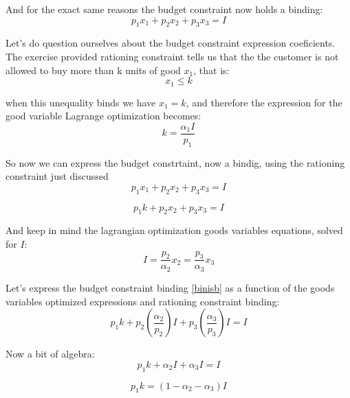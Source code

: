 \documentclass{article}
\begin{document}
\medskip

And for the exact same reasons the budget constraint now holds a binding:
\begin{equation}\label{bin}
   p_1x_1 + p_2x_2 + p_3x_3 = I
\end{equation}

Let's do question ourselves about the budget constraint expression coeficients. The exercise provided rationing constraint tells us that the the customer is not allowed to buy more than k units of good $x_1$, that is:
\begin{equation}
  x_1 \leq k
\end{equation}

when this unequality binds we have $x_1 = k$, and therefore the expression for the good variable Lagrange optimization becomes:
\begin{equation}
  k = \frac{\alpha_1 I}{p_1}
\end{equation}

So now we can express the budget constrtaint, now a bindig, using the rationing constraint just discussed
\begin{equation}\label{binis}
   p_1x_1+ p_2x_2 + p_3x_3 = I
\end{equation}

\begin{equation}\label{binisb}
  p_1k+ p_2x_2 + p_3x_3 = I
\end{equation}

And keep in mind the lagrangian optimization goods variables equations, solved for $I$:
\begin{equation}\label{bini}
  I = \frac{p_2}{\alpha_2}x_2 = \frac{p_3}{\alpha_3}x_3
\end{equation}

Let's express the budget constraint binding \ref{binisb} as a function of the goods variables optimized expressions and rationing constraint binding:
\begin{equation}
   p_1k+ p_2 \left( \frac{\alpha_2}{p_2} \right)I + p_3  \left( \frac{\alpha_3}{p_3} \right)I = I
\end{equation}

Now a bit of algebra:
\begin{equation}
   p_1k+ \alpha_2 I + \alpha_3 I = I
\end{equation}

\begin{equation}
   p_1k= (1 - \alpha_2 - \alpha_3) I
\end{equation}
\end{document}
